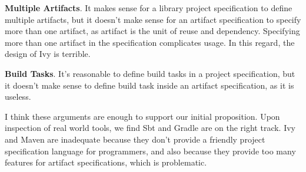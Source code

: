 \textbf{Multiple Artifacts}. It makes sense for a library project specification to define multiple artifacts, but it doesn't make sense for an artifact specification to specify more than one artifact, as artifact is the unit of reuse and dependency. Specifying more than one artifact in the specification complicates usage. In this regard, the design of Ivy is terrible.

\textbf{Build Tasks}. It's reasonable to define build tasks in a project specification, but it doesn't make sense to define build task inside an artifact specification, as it is useless.

I think these arguments are enough to support our initial proposition. Upon inspection of real world tools, we find Sbt and Gradle are on the right track. Ivy and Maven are inadequate because they don't provide a friendly project specification language for programmers, and also because they provide too many features for artifact specifications, which is problematic.
